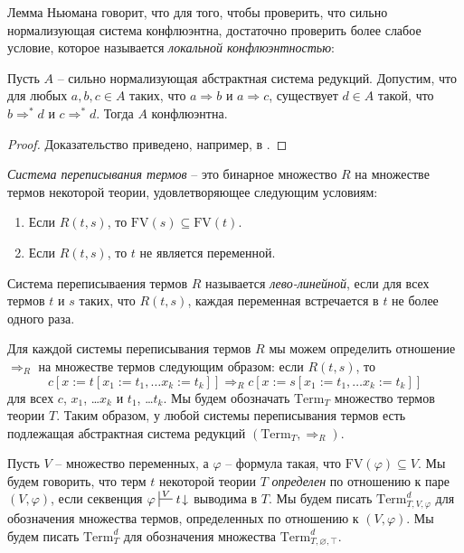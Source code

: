 \documentclass[reqno]{amsart}
\theoremstyle{definition}
\theoremstyle{remark}
\newcommand{\fs}[1]{\mathrm{#1}}
\newcommand{\FV}{\fs{FV}}
\newcommand{\repl}{:=}
\newcommand{\Term}{\mathrm{Term}}
\begin{document}
Лемма Ньюмана говорит, что для того, чтобы проверить, что сильно нормализующая система конфлюэнтна, достаточно проверить более слабое условие, которое называется \emph{локальной конфлюэнтностью}:

\begin{lem}
Пусть $A$ -- сильно нормализующая абстрактная система редукций.
Допустим, что для любых $a,b,c \in A$ таких, что $a \Rightarrow b$ и $a \Rightarrow c$, существует $d \in A$ такой, что $b \Rightarrow^* d$ и $c \Rightarrow^* d$.
Тогда $A$ конфлюэнтна.
\end{lem}
\begin{proof}
Доказательство приведено, например, в \cite[Lemma~2.2.5]{ohlebusch-advanced}.
\end{proof}

\emph{Система переписывания термов} -- это бинарное множество $R$ на множестве термов некоторой теории, удовлетворяющее следующим условиям:
\begin{enumerate}
\item Если $R(t,s)$, то $\FV(s) \subseteq \FV(t)$.
\item Если $R(t,s)$, то $t$ не является переменной.
\end{enumerate}
Система переписываения термов $R$ называется \emph{лево-линейной}, если для всех термов $t$ и $s$ таких, что $R(t,s)$, каждая переменная встречается в $t$ не более одного раза.

Для каждой системы переписывания термов $R$ мы можем определить отношение $\Rightarrow_R$ на множестве термов следующим образом: если $R(t,s)$, то
\[ c[x \repl t[x_1 \repl t_1, \ldots x_k \repl t_k]] \Rightarrow_R c[x \repl s[x_1 \repl t_1, \ldots x_k \repl t_k]] \]
для всех $c$, $x_1$, \ldots $x_k$ и $t_1$, \ldots $t_k$.
Мы будем обозначать $\Term_T$ множество термов теории $T$.
Таким образом, у любой системы переписывания термов есть подлежащая абстрактная система редукций $(\Term_T,\Rightarrow_R)$.

Пусть $V$ -- множество переменных, а $\varphi$ -- формула такая, что $\FV(\varphi) \subseteq V$.
Мы будем говорить, что терм $t$ некоторой теории $T$ \emph{определен} по отношению к паре $(V,\varphi)$, если секвенция $\varphi \sststile{}{V} t\!\downarrow$ выводима в $T$.
Мы будем писать $\Term_{T,V,\varphi}^d$ для обозначения множества термов, определенных по отношению к $(V,\varphi)$.
Мы будем писать $\Term_T^d$ для обозначения множества $\Term_{T,\varnothing,\top}^d$.
\end{document}
